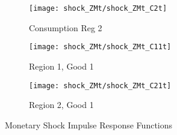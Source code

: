 \documentclass[../thesis.tex]{subfiles}
\begin{document}
\begin{figure}[h!]
		\begin{subfigure}[b]{0.3\textwidth}
			\centering
			\texttt{[image: shock\_ZMt/shock\_ZMt\_C2t]}
			\caption{\footnotesize Consumption Reg 2}
			\label{fig:ZMt-C2t}
		\end{subfigure}
		\hfill
		\begin{subfigure}[b]{0.3\textwidth}
			\centering
			\texttt{[image: shock\_ZMt/shock\_ZMt\_C11t]}
			\caption{\footnotesize Region 1, Good 1}
			\label{fig:ZMt-C11t}
		\end{subfigure}
		\hfill
		\begin{subfigure}[b]{0.3\textwidth}
			\centering
			\texttt{[image: shock\_ZMt/shock\_ZMt\_C21t]}
			\caption{\footnotesize Region 2, Good 1}
			\label{fig:ZMt-C21t}
		\end{subfigure}
		\hfill
		\vspace*{0.5cm}		
		\caption{Monetary Shock Impulse Response Functions}
		\label{fig:ZMt-irf}
	\end{figure}


\newpage
\end{document}
